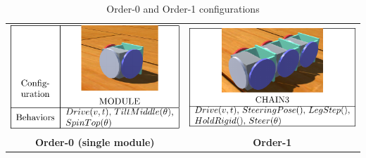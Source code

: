 \documentclass[graybox]{svmult}
\begin{document}
\begin{table}
     \begin{center}
        \begin{tabular}{c c}
         \includegraphics[scale=1]{images/library/tier0.pdf} &
         \includegraphics[scale=1]{images/library/tier1.pdf} \\
         \textbf{Order-0 (single module)} & \textbf{Order-1}
        \end{tabular}
         \caption{Order-0 and Order-1 configurations}
         \label{Order-1-configurations}
     \end{center}
\end{table}
\end{document}
